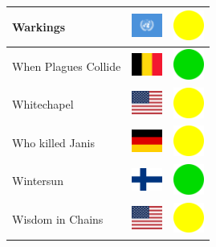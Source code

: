 \documentclass[12pt, a4paper, twoside]{report}
\begin{document}
\begin{center}
\begin{longtable}{|p{5cm}|p{2cm}|p{2cm}|}
Warkings & \includegraphics[width=1cm]{4x3/un} & \includegraphics[width=1cm]{likes/m} \\ \hline
When Plagues Collide & \includegraphics[width=1cm]{4x3/be} & \includegraphics[width=1cm]{likes/y} \\ \hline
Whitechapel & \includegraphics[width=1cm]{4x3/us} & \includegraphics[width=1cm]{likes/m} \\ \hline
Who killed Janis & \includegraphics[width=1cm]{4x3/de} & \includegraphics[width=1cm]{likes/m} \\ \hline
Wintersun & \includegraphics[width=1cm]{4x3/fi} & \includegraphics[width=1cm]{likes/y} \\ \hline
Wisdom in Chains & \includegraphics[width=1cm]{4x3/us} & \includegraphics[width=1cm]{likes/m} \\ \hline

\end{longtable}
\end{center}
\end{document}
